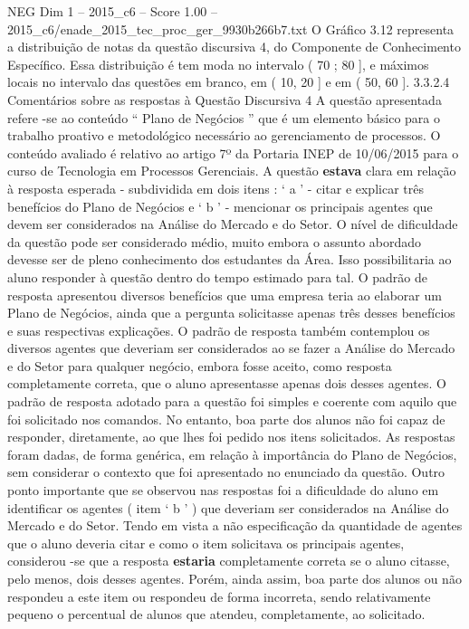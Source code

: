 \begin{textsample}{NEG Dim 1 – 2015\_c6 – Score 1.00 – 2015\_c6/enade\_2015\_tec\_proc\_ger\_9930b266b7.txt}
O Gráfico 3.12 representa a distribuição de notas da questão discursiva 4, do Componente de Conhecimento Específico.
Essa distribuição é tem moda no intervalo ( 70 ; 80 ], e máximos locais no intervalo das questões em branco, em ( 10, 20 ] e em ( 50, 60 ]. 3.3.2.4 Comentários sobre as respostas à Questão Discursiva 4 A questão apresentada refere -se ao conteúdo “ Plano de Negócios ” que é um elemento básico para o trabalho proativo e metodológico necessário ao gerenciamento de processos.
O conteúdo avaliado é relativo ao artigo 7º da Portaria INEP de 10/06/2015 para o curso de Tecnologia em Processos Gerenciais.
A questão \textbf{estava} clara em relação à resposta esperada - subdividida em dois itens : ‘ a ’ - citar e explicar três benefícios do Plano de Negócios e ‘ b ’ - mencionar os principais agentes que devem ser considerados na Análise do Mercado e do Setor.
O nível de dificuldade da questão pode ser considerado médio, muito embora o assunto abordado devesse ser de pleno conhecimento dos estudantes da Área.
Isso possibilitaria ao aluno responder à questão dentro do tempo estimado para tal.
O padrão de resposta apresentou diversos benefícios que uma empresa teria ao elaborar um Plano de Negócios, ainda que a pergunta solicitasse apenas três desses benefícios e suas respectivas explicações.
O padrão de resposta também contemplou os diversos agentes que deveriam ser considerados ao se fazer a Análise do Mercado e do Setor para qualquer negócio, embora fosse aceito, como resposta completamente correta, que o aluno apresentasse apenas dois desses agentes.
O padrão de resposta adotado para a questão foi simples e coerente com aquilo que foi solicitado nos comandos.
No entanto, boa parte dos alunos não foi capaz de responder, diretamente, ao que lhes foi pedido nos itens solicitados.
As respostas foram dadas, de forma genérica, em relação à importância do Plano de Negócios, sem considerar o contexto que foi apresentado no enunciado da questão.
Outro ponto importante que se observou nas respostas foi a dificuldade do aluno em identificar os agentes ( item ‘ b ’ ) que deveriam ser considerados na Análise do Mercado e do Setor.
Tendo em vista a não especificação da quantidade de agentes que o aluno deveria citar e como o item solicitava os principais agentes, considerou -se que a resposta \textbf{estaria} completamente correta se o aluno citasse, pelo menos, dois desses agentes.
Porém, ainda assim, boa parte dos alunos ou não respondeu a este item ou respondeu de forma incorreta, sendo relativamente pequeno o percentual de alunos que atendeu, completamente, ao solicitado.

\end{textsample}
